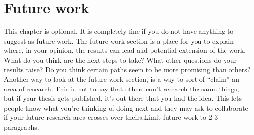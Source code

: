 \chapter{Future work}
\label{chap:chap7}

This chapter is optional. It is completely fine if you do not have anything to suggest as future work. The future work section is a place for you to explain where, in your opinion, the results can lead and potential extension of the work. What do you think are the next steps to take? What other questions do your results raise? Do you think certain paths seem to be more promising than others? Another way to look at the future work section, is a way to sort of ``claim” an area of research. This is not to say that others can’t research the same things, but if your thesis gets published, it’s out there that you had the idea. This lets people know what you’re thinking of doing next and they may ask to collaborate if your future research area crosses over theirs.Limit future work to 2-3 paragraphs.

\clearpage %